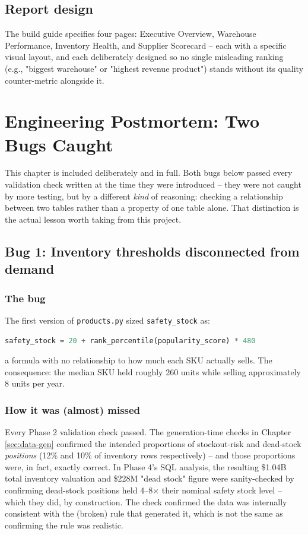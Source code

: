 \documentclass[11pt,a4paper]{report}
\begin{document}
\section{Report design}

The build guide specifies four pages: Executive Overview, Warehouse
Performance, Inventory Health, and Supplier Scorecard -- each with a
specific visual layout, and each deliberately designed so no single
misleading ranking (e.g., "biggest warehouse" or "highest revenue product")
stands without its quality counter-metric alongside it.

\chapter{Engineering Postmortem: Two Bugs Caught}
\label{ch:postmortem}

This chapter is included deliberately and in full. Both bugs below passed
every validation check written at the time they were introduced -- they
were not caught by more testing, but by a different \emph{kind} of
reasoning: checking a relationship between two tables rather than a
property of one table alone. That distinction is the actual lesson worth
taking from this project.

\section{Bug 1: Inventory thresholds disconnected from demand}

\subsection*{The bug}
The first version of \texttt{products.py} sized \texttt{safety\_stock} as:
\begin{lstlisting}[language=Python]
safety_stock = 20 + rank_percentile(popularity_score) * 480
\end{lstlisting}
a formula with no relationship to how much each SKU actually sells. The
consequence: the median SKU held roughly 260 units while selling
approximately 8 units per year.

\subsection*{How it was (almost) missed}
\label{sec:bug1-precursor}
Every Phase 2 validation check passed. The generation-time checks in
Chapter \ref{sec:data-gen} confirmed the intended proportions of
stockout-risk and dead-stock \emph{positions} (12\% and 10\% of inventory
rows respectively) -- and those proportions were, in fact, exactly
correct. In Phase 4's SQL analysis, the resulting \$1.04B total inventory
valuation and \$228M "dead stock" figure were sanity-checked by confirming
dead-stock positions held 4--8$\times$ their nominal safety stock level --
which they did, by construction. The check confirmed the data was
internally consistent with the (broken) rule that generated it, which is
not the same as confirming the rule was realistic.
\end{document}
